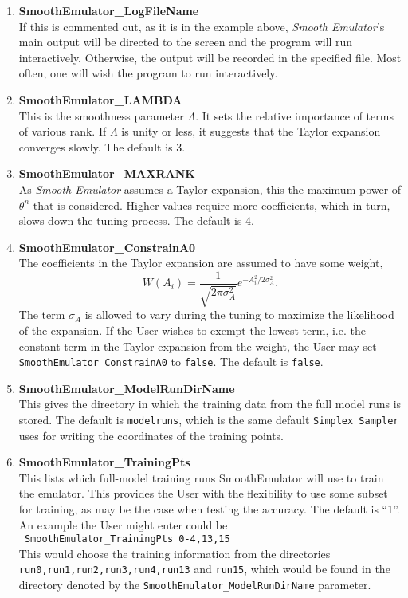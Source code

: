 \documentclass[UserManual.tex]{subfiles}
\begin{document}
\begin{enumerate}\itemsep 0pt
\item {\bf SmoothEmulator\_LogFileName}\\
If this is commented out, as it is in the example above, {\it Smooth Emulator}'s main output will be directed to the screen and the program will run interactively. Otherwise, the output will be recorded in the specified file. Most often, one will wish the program to run interactively.

\item {\bf SmoothEmulator\_LAMBDA}\\
This is the smoothness parameter $\Lambda$. It sets the relative importance of terms of various rank. If $\Lambda$ is unity or less, it suggests that the Taylor expansion converges slowly. The default is 3.

\item {\bf SmoothEmulator\_MAXRANK}\\
As {\it Smooth Emulator} assumes a Taylor expansion, this the maximum power of $\theta^n$ that is considered. Higher values require more coefficients, which in turn, slows down the tuning process. The default is 4.

\item {\bf SmoothEmulator\_ConstrainA0}\\
The coefficients in the Taylor expansion are assumed to have some weight,
\[
W(A_i)=\frac{1}{\sqrt{2\pi\sigma_A^2}}e^{-A_i^2/2\sigma_A^2}.
\]
The term $\sigma_A$ is allowed to vary during the tuning to maximize the likelihood of the expansion. If the User wishes to exempt the lowest term, i.e. the constant term in the Taylor expansion from the weight, the User may set {\tt SmoothEmulator\_ConstrainA0} to {\tt false}. The default is {\tt false}.

\item {\bf SmoothEmulator\_ModelRunDirName}\\
This gives the directory in which the training data from the full model runs is stored. The default is {\tt modelruns}, which is the same default {\tt Simplex Sampler} uses for writing the coordinates of the training points.

\item {\bf SmoothEmulator\_TrainingPts}\\
This lists which full-model training runs SmoothEmulator will use to train the emulator. This provides the User with the flexibility to use some subset for training, as may be the case when testing the accuracy. The default is ``1''. An example the User might enter could be\\
{\tt ~SmoothEmulator\_TrainingPts  0-4,13,15}\\
This would choose the training information from the directories {\tt run0,run1,run2,run3,run4,run13} and {\tt run15}, which would be found in the directory denoted by the {\tt SmoothEmulator\_ModelRunDirName} parameter.


\end{enumerate}
\end{document}
